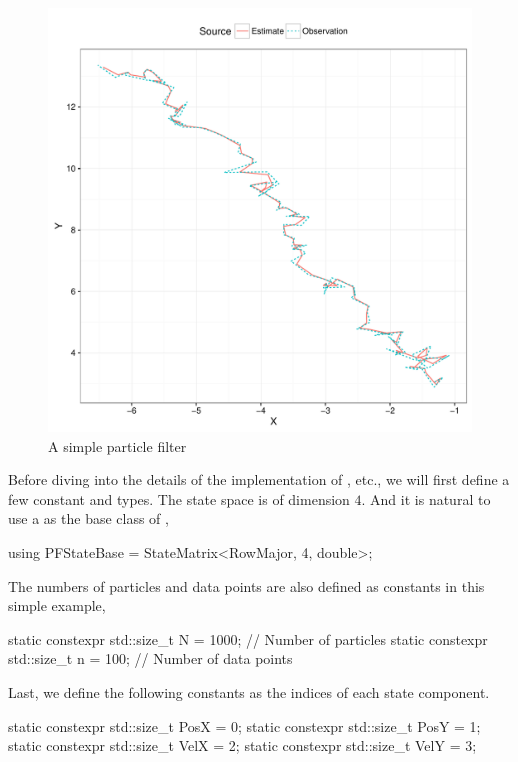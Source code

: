 \begin{figure}
  \includegraphics[width=\linewidth]{cpp/pf}
  \caption{A simple particle filter}
  \label{fig:pf}
\end{figure}

Before diving into the details of the implementation of ,
etc., we will first define a few constant and types. The state space is of
dimension $4$. And it is natural to use a  as the base
class of ,
\begin{cppcode}
  using PFStateBase = StateMatrix<RowMajor, 4, double>;
\end{cppcode}
The numbers of particles and data points are also defined as constants in this
simple example,
\begin{cppcode}
  static constexpr std::size_t N = 1000; // Number of particles
  static constexpr std::size_t n = 100;  // Number of data points
\end{cppcode}
Last, we define the following constants as the indices of each state component.
\begin{cppcode}
  static constexpr std::size_t PosX = 0;
  static constexpr std::size_t PosY = 1;
  static constexpr std::size_t VelX = 2;
  static constexpr std::size_t VelY = 3;
\end{cppcode}

